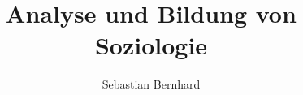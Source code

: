 \documentclass[a4paper]{article}
\begin{document}
\author{Sebastian Bernhard}
\title{Analyse und Bildung von Soziologie}
\maketitle
\tableofcontents




%
%
 
\end{document}
